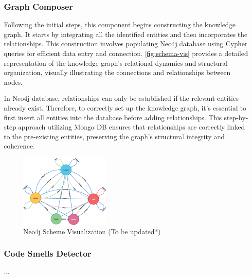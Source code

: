 \subsubsection{Graph Composer}

Following the initial steps, this component begins constructing the knowledge graph. It starts by integrating all the identified entities and then incorporates the relationships. This construction involves populating Neo4j database using Cypher queries for efficient data entry and connection. \autoref{fig:schema-vis} provides a detailed representation of the knowledge graph's relational dynamics and structural organization, visually illustrating the connections and relationships between nodes.

In Neo4j database, relationships can only be established if the relevant entities already exist. Therefore, to correctly set up the knowledge graph, it's essential to first insert all entities into the database before adding relationships. This step-by-step approach utilizing Mongo DB ensures that relationships are correctly linked to the pre-existing entities, preserving the graph's structural integrity and coherence.



\begin{figure}[htbp]
\begin{center}
    \includegraphics[width=0.4\textwidth]{figures/graph.eps}
\end{center}
\caption{Neo4j Scheme Visualization (To be updated*)}
\label{fig:schema-vis}
\end{figure}


\subsubsection{Code Smells Detector}
...

\newpage
\newpage
\newpage
\newpage
